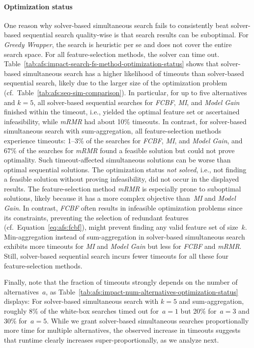 \documentclass{article}
\theoremstyle{definition}
\begin{document}
\paragraph{Optimization status}

One reason why solver-based simultaneous search fails to consistently beat solver-based sequential search quality-wise is that search results can be suboptimal.
For \emph{Greedy Wrapper}, the search is heuristic per se and does not cover the entire search space.
For all feature-selection methods, the solver can time out.
Table~\ref{tab:afs:impact-search-fs-method-optimization-status} shows that solver-based simultaneous search has a higher likelihood of timeouts than solver-based sequential search, likely due to the larger size of the optimization problem (cf.~Table~\ref{tab:afs:seq-sim-comparison}).
In particular, for up to five alternatives and $k=5$, all solver-based sequential searches for \emph{FCBF}, \emph{MI}, and \emph{Model Gain} finished within the timeout, i.e., yielded the optimal feature set or ascertained infeasibility, while \emph{mRMR} had about 10\% timeouts.
In contrast, for solver-based simultaneous search with sum-aggregation, all feature-selection methods experience timeouts:
1--3\% of the searches for \emph{FCBF}, \emph{MI}, and \emph{Model Gain}, and 67\% of the searches for \emph{mRMR} found a feasible solution but could not prove optimality.
Such timeout-affected simultaneous solutions can be worse than optimal sequential solutions.
The optimization status \emph{not solved}, i.e., not finding a feasible solution without proving infeasibility, did not occur in the displayed results.
The feature-selection method \emph{mRMR} is especially prone to suboptimal solutions, likely because it has a more complex objective than~\emph{MI} and \emph{Model Gain}.
In contrast, \emph{FCBF} often results in infeasible optimization problems since its constraints, preventing the selection of redundant features (cf.~Equation~\ref{eq:afs:fcbf}), might prevent finding any valid feature set of size~$k$.
Min-aggregation instead of sum-aggregation in solver-based simultaneous search exhibits more timeouts for \emph{MI} and \emph{Model Gain} but less for \emph{FCBF} and \emph{mRMR}.
Still, solver-based sequential search incurs fewer timeouts for all these four feature-selection methods.

Finally, note that the fraction of timeouts strongly depends on the number of alternatives~$a$, as Table~\ref{tab:afs:impact-num-alternatives-optimization-status} displays:
For solver-based simultaneous search with $k=5$ and sum-aggregation, roughly 8\% of the white-box searches timed out for~$a=1$ but 20\% for~$a=3$ and 30\% for~$a=5$.
While we grant solver-based simultaneous searches proportionally more time for multiple alternatives, the observed increase in timeouts suggests that runtime clearly increases super-proportionally, as we analyze next.
\end{document}
